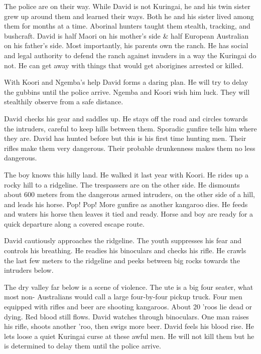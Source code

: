 The police are on their way.   While David is not Kuringai, he and his twin sister grew up around them and learned their ways. Both he and his sister lived among them for months at a time.  Aborinal hunters taught them stealth, tracking, and bushcraft.  David is half Maori on his mother's side \& half European Australian on his father's side.  Most importantly, his parents own the ranch.  He has social and legal authority to defend the ranch against invaders in a way the Kuringai do not.  He can get away with things that would get aborigines arrested or killed.

With Koori and Ngemba's help David forms a daring plan. He will try to delay the gubbins until the police arrive.  Ngemba and Koori wish him luck.  They will stealthily observe from a safe distance.

David checks his gear and saddles up.  He stays off the road and circles towards the intruders, careful to keep hills between them.  Sporadic gunfire tells him where they are.  David has hunted before but this is his first time hunting men.  Their rifles make them very dangerous.  Their probable drunkenness makes them no less dangerous.

The boy knows this hilly land.  He walked it last year with Koori.  He rides up a rocky hill to a ridgeline.  The trespassers are on the other side.  He dismounts about 600 meters from the dangerous armed intruders, on the other side of a hill, and leads his horse. Pop! Pop! More gunfire as another kangaroo dies.   He feeds and waters his horse then leaves it tied and ready. Horse and boy are ready for a quick departure along a covered escape route.

David cautiously approaches the ridgeline.   The youth suppresses his fear and controls his breathing. He readies his binoculars and checks his rifle.  He crawls the last few meters to the ridgeline and peeks between big rocks towards the intruders below.

The dry valley far below is a scene of violence.  The ute is a big four seater, what most non- Australians would call a large four-by-four pickup truck.   Four men equipped with rifles and beer are shooting kangaroos.  About 20 'roos lie dead or dying.  Red blood still flows.  David watches through binoculars.  One man raises his rifle, shoots another 'roo, then swigs more beer.  David feels his blood rise.  He lets loose a quiet Kuringai curse at these awful men. He will not kill them but he is determined to delay them until the police arrive.

